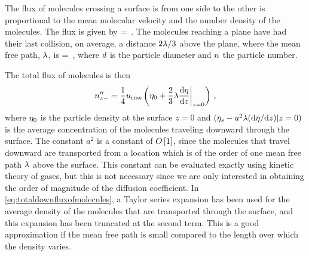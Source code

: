 The flux of molecules crossing a surface is from one side to the other is proportional to the mean molecular velocity and the number density of the molecules. The flux is given by
\beq
\flux\npart = \npartdens\vel{}\,.
\eeq
The molecules reaching a plane have had their last collision, on average, a distance $2\lambda/3$ above the plane, where the mean free path, $\lambda$, is
\beq
\mfpath = \,,
\eeq
where $d$ is the particle diameter and $n$ the particle number.

The total flux of molecules is then
\begin{equation}\label{eq:totaldownfluxofmolecules}
{n}^{\prime\prime}_{z-} = \dfrac{1}{4}u_\text{rms}
                    \left(\eta_0 + \dfrac{2}{3}\lambda\dfrac{\text{d}{\eta}}{\text{d}{z}}\biggr\rvert_{z = 0}\right)\,,
\end{equation}
where $\eta_0$ is the particle density at the surface $z = 0$ and $(\eta_s - a^2\lambda(\text{d}\eta/\text{d} z)|z = 0)$ is the average concentration of the molecules traveling downward through the surface. The constant $a^2$ is a constant of $O\left[{1}\right]$, since the molecules that travel downward are transported from a location which is of the order of one mean free path $\lambda$ above the surface. This constant can be evaluated exactly using kinetic theory of gases, but this is not necessary since we are only interested in obtaining the order of magnitude of the diffusion coefficient. In \cref{eq:totaldownfluxofmolecules}, a Taylor series expansion has been used for the average density of the molecules that are transported through the surface, and this expansion has been truncated at the second term. This is a good approximation if the mean free path is small compared to the length over which the density varies.

